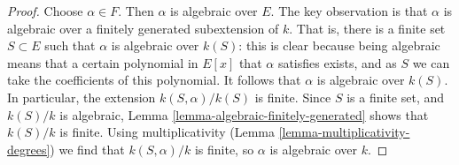 \documentclass[10pt,a4paper]{amsart}
\theoremstyle{plain}
\theoremstyle{definition}
\theoremstyle{remark}
\numberwithin{equation}{subsection}
\begin{document}
\begin{proof}
Choose $\alpha \in F$. Then $\alpha$ is algebraic over $E$.
The key observation is that $\alpha$ is algebraic over a
finitely generated subextension of $k$.
That is, there is a finite set $S \subset E$ such that $\alpha $ is algebraic
over $k(S)$: this is clear because being algebraic means that a certain
polynomial in $E[x]$ that $\alpha$ satisfies exists, and as $S$ we can take the
coefficients of this polynomial. It follows that $\alpha$ is algebraic over
$k(S)$. In particular, the extension $k(S, \alpha)/ k(S)$ is finite.
Since $S$ is a finite set, and $k(S)/k$ is algebraic,
Lemma \ref{lemma-algebraic-finitely-generated} shows that
$k(S)/k$ is finite. Using multiplicativity
(Lemma \ref{lemma-multiplicativity-degrees})
we find that $k(S,\alpha)/k$ is finite, so $\alpha$ is algebraic over $k$.
\end{proof}
\end{document}
